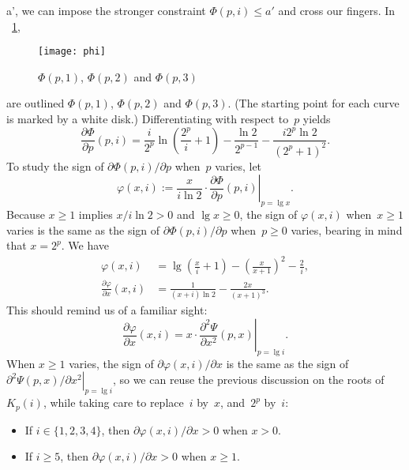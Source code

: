 \leqslant a'\), we can impose the stronger constraint \(\Phi(p,i)
\leqslant a'\) and cross our fingers. In \fig~\ref{fig:phi},
\begin{figure}
\centering
\begin{sideways}
\texttt{[image: phi]} 
\end{sideways}
\caption{\(\Phi(p,1)\), \(\Phi(p,2)\) and \(\Phi(p,3)\) \label{fig:phi}}
\end{figure}
are outlined \(\Phi(p,1)\), \(\Phi(p,2)\) and \(\Phi(p,3)\). (The
starting point for each curve is marked by a white disk.)
Differentiating with respect to~\(p\) yields
\begin{equation*}
\frac{\partial\Phi}{\partial p}(p,i) = 
\frac{i}{2^p}\ln\left(\frac{2^p}{i}+1\right)
- \frac{\ln 2}{2^{p-1}} - \frac{i2^p\ln 2}{(2^p+1)^2}.
\end{equation*}
To study the sign of \(\partial\Phi(p,i)/\partial p\) when~\(p\)
varies, let
\begin{equation*}
\varphi(x,i) := \frac{x}{i\ln 2} \cdot
                \left.\frac{\partial\Phi}{\partial
                    p}(p,i)\right|_{p=\lg x}.
\end{equation*}
Because \(x \geqslant 1\) implies \(x/i\ln 2 > 0\) and \(\lg x
\geqslant 0\), the sign of \(\varphi(x,i)\) when~\(x \geqslant 1\)
varies is the same as the sign of \(\partial\Phi(p,i)/\partial p\)
when~\(p \geqslant 0\) varies, bearing in mind that \(x=2^p\). We
have
\begin{align*}
\varphi(x,i) &= \lg\left(\frac{x}{i}+1\right) -
\left(\!\frac{x}{x+1}\!\right)^2 - \frac{2}{i},\\
\frac{\partial\varphi}{\partial x}(x,i) &=
\frac{1}{(x+i)\ln 2} - \frac{2x}{(x+1)^3}.
\end{align*}
This should remind us of a familiar sight:
\begin{equation*}
\frac{\partial\varphi}{\partial x}(x,i) =
  x \cdot \left.\frac{\partial^2\Psi}{\partial x^2}(p,x)\right|_{p=\lg
  i}.
\end{equation*}
When \(x \geqslant 1\) varies, the sign of
\(\partial\varphi(x,i)/\partial x\) is the same as the sign of
\(\left.\partial^2\Psi(p,x)/\partial x^2\right|_{p=\lg i}\), so we can
reuse the previous discussion on the roots of \(K_p(i)\), while taking
care to replace~\(i\) by~\(x\), and~\(2^p\) by~\(i\):
\begin{itemize}

\item If \(i \in \{1,2,3,4\}\), then \(\partial\varphi(x,i)/\partial x
  > 0\) when \(x > 0\).

\item If \(i \geqslant 5\), then \(\partial\varphi(x,i)/\partial x >
  0\) when \(x \geqslant 1\).

\end{itemize}
